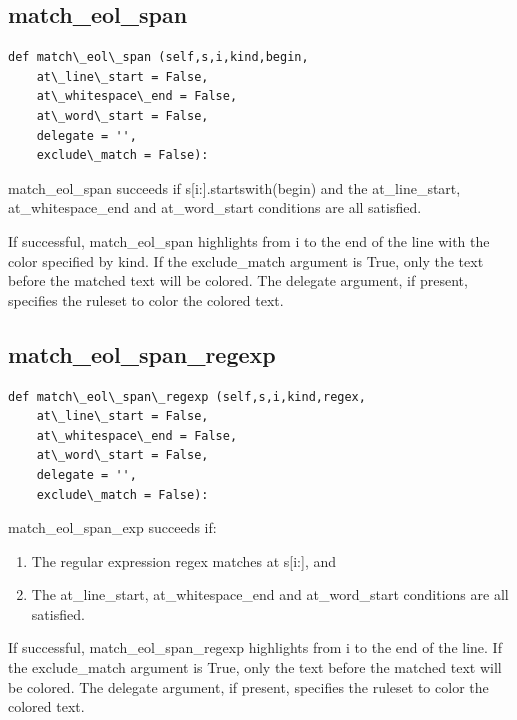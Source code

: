 \documentclass[a4paper,10pt,english]{sphinxmanual}
\begin{document}
\subsection{match\_eol\_span}
\label{coloring:match-eol-span}
\begin{Verbatim}[commandchars=\\\{\}]
def match\_eol\_span (self,s,i,kind,begin,
    at\_line\_start = False,
    at\_whitespace\_end = False,
    at\_word\_start = False,
    delegate = '',
    exclude\_match = False):
\end{Verbatim}

match\_eol\_span succeeds if s{[}i:{]}.startswith(begin) and
the at\_line\_start, at\_whitespace\_end and at\_word\_start conditions are all satisfied.

If successful, match\_eol\_span highlights from i to the end of the line
with the color specified by kind.
If the exclude\_match argument is True, only the text before the matched text will be colored.
The delegate argument, if present, specifies the ruleset to color the colored text.


\subsection{match\_eol\_span\_regexp}
\label{coloring:match-eol-span-regexp}
\begin{Verbatim}[commandchars=\\\{\}]
def match\_eol\_span\_regexp (self,s,i,kind,regex,
    at\_line\_start = False,
    at\_whitespace\_end = False,
    at\_word\_start = False,
    delegate = '',
    exclude\_match = False):
\end{Verbatim}

match\_eol\_span\_exp succeeds if:
\begin{enumerate}
\item {} 
The regular expression regex matches at s{[}i:{]}, and

\item {} 
The at\_line\_start, at\_whitespace\_end and at\_word\_start conditions are all satisfied.

\end{enumerate}

If successful, match\_eol\_span\_regexp  highlights from i to the end of the line.
If the exclude\_match argument is True, only the text before the matched text will be colored.
The delegate argument, if present, specifies the ruleset to color the colored text.
\end{document}
